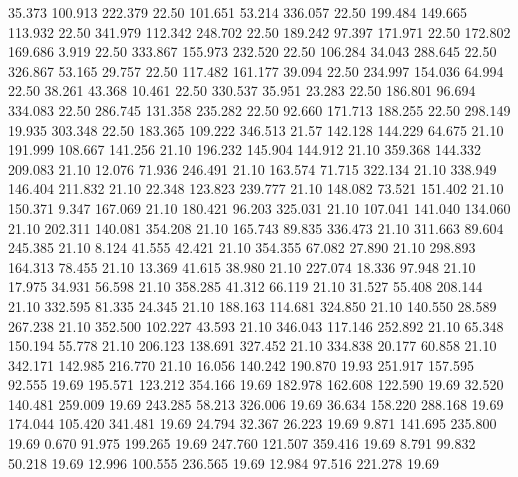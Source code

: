   35.373  100.913  222.379        22.50
 101.651   53.214  336.057        22.50
 199.484  149.665  113.932        22.50
 341.979  112.342  248.702        22.50
 189.242   97.397  171.971        22.50
 172.802  169.686    3.919        22.50
 333.867  155.973  232.520        22.50
 106.284   34.043  288.645        22.50
 326.867   53.165   29.757        22.50
 117.482  161.177   39.094        22.50
 234.997  154.036   64.994        22.50
  38.261   43.368   10.461        22.50
 330.537   35.951   23.283        22.50
 186.801   96.694  334.083        22.50
 286.745  131.358  235.282        22.50
  92.660  171.713  188.255        22.50
 298.149   19.935  303.348        22.50
 183.365  109.222  346.513        21.57
 142.128  144.229   64.675        21.10
 191.999  108.667  141.256        21.10
 196.232  145.904  144.912        21.10
 359.368  144.332  209.083        21.10
  12.076   71.936  246.491        21.10
 163.574   71.715  322.134        21.10
 338.949  146.404  211.832        21.10
  22.348  123.823  239.777        21.10
 148.082   73.521  151.402        21.10
 150.371    9.347  167.069        21.10
 180.421   96.203  325.031        21.10
 107.041  141.040  134.060        21.10
 202.311  140.081  354.208        21.10
 165.743   89.835  336.473        21.10
 311.663   89.604  245.385        21.10
   8.124   41.555   42.421        21.10
 354.355   67.082   27.890        21.10
 298.893  164.313   78.455        21.10
  13.369   41.615   38.980        21.10
 227.074   18.336   97.948        21.10
  17.975   34.931   56.598        21.10
 358.285   41.312   66.119        21.10
  31.527   55.408  208.144        21.10
 332.595   81.335   24.345        21.10
 188.163  114.681  324.850        21.10
 140.550   28.589  267.238        21.10
 352.500  102.227   43.593        21.10
 346.043  117.146  252.892        21.10
  65.348  150.194   55.778        21.10
 206.123  138.691  327.452        21.10
 334.838   20.177   60.858        21.10
 342.171  142.985  216.770        21.10
  16.056  140.242  190.870        19.93
 251.917  157.595   92.555        19.69
 195.571  123.212  354.166        19.69
 182.978  162.608  122.590        19.69
  32.520  140.481  259.009        19.69
 243.285   58.213  326.006        19.69
  36.634  158.220  288.168        19.69
 174.044  105.420  341.481        19.69
  24.794   32.367   26.223        19.69
   9.871  141.695  235.800        19.69
   0.670   91.975  199.265        19.69
 247.760  121.507  359.416        19.69
   8.791   99.832   50.218        19.69
  12.996  100.555  236.565        19.69
  12.984   97.516  221.278        19.69
